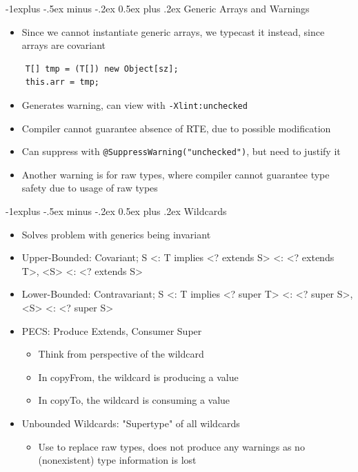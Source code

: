 \documentclass[10pt, landscape]{article}
\makeatletter
\renewcommand{\section}{\@startsection{section}{1}{0mm}%
                                {-1ex plus -.5ex minus -.2ex}%
                                {0.5ex plus .2ex}%
                                {\normalfont\large\bfseries}}
\renewcommand{\section}{\@startsection{section}{2}{0mm}%
                                {-1explus -.5ex minus -.2ex}%
                                {0.5ex plus .2ex}%
                                {\normalfont\normalsize\bfseries}}
\makeatother
\begin{document}
\begin{multicols*}{4}
\section{Generic Arrays and Warnings}
\begin{itemize}
    \item Since we cannot instantiate generic arrays, we typecast it instead, since arrays are covariant
\end{itemize}
\begin{lstlisting}
    T[] tmp = (T[]) new Object[sz];
    this.arr = tmp;
\end{lstlisting}
\begin{itemize}
    \item Generates warning, can view with \verb|-Xlint:unchecked|
    \item Compiler cannot guarantee absence of RTE, due to possible modification
    \item Can suppress with \verb|@SuppressWarning("unchecked")|, but need to justify it
    \item Another warning is for raw types, where compiler cannot guarantee type safety due to usage of raw types
\end{itemize}

\section{Wildcards}
\begin{itemize}
    \item Solves problem with generics being invariant
    \item Upper-Bounded: Covariant; S <: T implies <? extends S> <: <? extends T>, <S> <: <? extends S>
    \item Lower-Bounded: Contravariant; S <: T implies <? super T> <: <? super S>, <S> <: <? super S>
    \item PECS: Produce Extends, Consumer Super
    \begin{itemize}
        \item Think from perspective of the wildcard
        \item In copyFrom, the wildcard is producing a value
        \item In copyTo, the wildcard is consuming a value
    \end{itemize}
    \item Unbounded Wildcards: "Supertype" of all wildcards
    \begin{itemize}
        \item Use to replace raw types, does not produce any warnings as no (nonexistent) type information is lost
    \end{itemize}
\end{itemize}


\end{multicols*}
\end{document}
